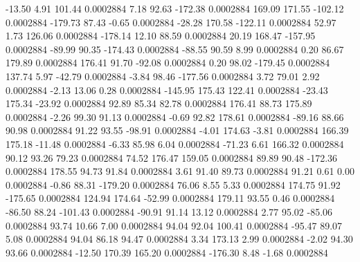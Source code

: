       -13.50        4.91      101.44     0.0002884
        7.18       92.63     -172.38     0.0002884
      169.09      171.55     -102.12     0.0002884
     -179.73       87.43       -0.65     0.0002884
      -28.28      170.58     -122.11     0.0002884
       52.97        1.73      126.06     0.0002884
     -178.14       12.10       88.59     0.0002884
       20.19      168.47     -157.95     0.0002884
      -89.99       90.35     -174.43     0.0002884
      -88.55       90.59        8.99     0.0002884
        0.20       86.67      179.89     0.0002884
      176.41       91.70      -92.08     0.0002884
        0.20       98.02     -179.45     0.0002884
      137.74        5.97      -42.79     0.0002884
       -3.84       98.46     -177.56     0.0002884
        3.72       79.01        2.92     0.0002884
       -2.13       13.06        0.28     0.0002884
     -145.95      175.43      122.41     0.0002884
      -23.43      175.34      -23.92     0.0002884
       92.89       85.34       82.78     0.0002884
      176.41       88.73      175.89     0.0002884
       -2.26       99.30       91.13     0.0002884
       -0.69       92.82      178.61     0.0002884
      -89.16       88.66       90.98     0.0002884
       91.22       93.55      -98.91     0.0002884
       -4.01      174.63       -3.81     0.0002884
      166.39      175.18      -11.48     0.0002884
       -6.33       85.98        6.04     0.0002884
      -71.23        6.61      166.32     0.0002884
       90.12       93.26       79.23     0.0002884
       74.52      176.47      159.05     0.0002884
       89.89       90.48     -172.36     0.0002884
      178.55       94.73       91.84     0.0002884
        3.61       91.40       89.73     0.0002884
       91.21        0.61        0.00     0.0002884
       -0.86       88.31     -179.20     0.0002884
       76.06        8.55        5.33     0.0002884
      174.75       91.92     -175.65     0.0002884
      124.94      174.64      -52.99     0.0002884
      179.11       93.55        0.46     0.0002884
      -86.50       88.24     -101.43     0.0002884
      -90.91       91.14       13.12     0.0002884
        2.77       95.02      -85.06     0.0002884
       93.74       10.66        7.00     0.0002884
       94.04       92.04      100.41     0.0002884
      -95.47       89.07        5.08     0.0002884
       94.04       86.18       94.47     0.0002884
        3.34      173.13        2.99     0.0002884
       -2.02       94.30       93.66     0.0002884
      -12.50      170.39      165.20     0.0002884
     -176.30        8.48       -1.68     0.0002884
